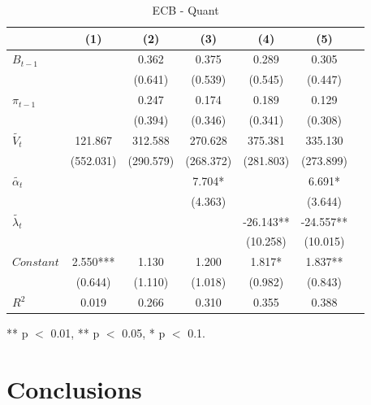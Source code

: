 \documentclass[review]{elsarticle}
\begin{document}
\begin{table}[!ht]
\centering 
  \caption{ECB - Quant} 
  \label{tab:ECB - Quant}
\begin{tabular}{l*{6}{c}}   
\toprule
                    & (1) & (2) & (3) & (4) & (5) \\
\midrule
$B_{t-1}$           &     & 0.362 & 0.375 & 0.289 & 0.305 \\
                    &     & (0.641) & (0.539) & (0.545) & (0.447) \\
$\pi_{t-1}$         &     & 0.247 & 0.174 & 0.189 & 0.129 \\
                    &     & (0.394) & (0.346) & (0.341) & (0.308) \\
$\tilde{V_t}$       & 121.867 & 312.588 & 270.628 & 375.381 & 335.130 \\
                    & (552.031) & (290.579) & (268.372) & (281.803) & (273.899) \\
$\tilde{\alpha_t}$  &     &     & 7.704* &     & 6.691* \\
                    &     &     & (4.363) &     & (3.644) \\
$\tilde{\lambda_t}$ &     &     &     & -26.143** & -24.557** \\
                    &     &     &     & (10.258) & (10.015) \\
$Constant$          & 2.550*** & 1.130 & 1.200 & 1.817* & 1.837** \\
                    & (0.644) & (1.110) & (1.018) & (0.982) & (0.843) \\
\midrule
$R^2$               & 0.019 & 0.266 & 0.310 & 0.355 & 0.388 \\
\bottomrule
\end{tabular} 
\parbox{0.8\textwidth}{\centering \small *** p $<$ 0.01, ** p $<$ 0.05, * p $<$ 0.1.}
\end{table}

\newpage


\section{Conclusions} \label{sec:Conclusions}




\newpage

\appendix
\end{document}
